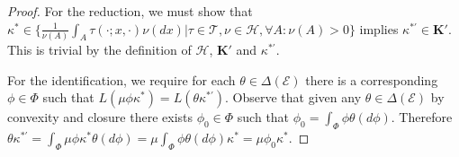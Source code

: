 \begin{proof}
For the reduction, we must show that $\kappa^*\in \{\frac{1}{\nu(A)}\int_A \tau(\cdot;x,\cdot)\nu(dx)|\tau\in \mathscr{T},\nu\in\mathscr{H},\forall A:\nu(A)>0\}$ implies $\kappa^{*\prime}\in \mathbf{K}'$. This is trivial by the definition of $\mathscr{H}$, $\mathbf{K}'$ and $\kappa^{*\prime}$.

For the identification, we require for each $\theta\in \Delta(\mathcal{E})$ there is a corresponding $\phi\in \Phi$ such that $L(\mu\phi\kappa^*)=L(\theta\kappa^{*\prime})$. Observe that given any $\theta\in \Delta(\mathcal{E})$ by convexity and closure there exists $\phi_0\in \Phi$ such that $\phi_0 = \int_\Phi \phi \theta(d\phi)$. Therefore $\theta\kappa^{*\prime}=\int_\Phi \mu \phi \kappa^* \theta(d\phi) = \mu \int_\Phi \phi \theta(d\phi) \kappa^*=\mu\phi_0\kappa^*$.
\end{proof}
